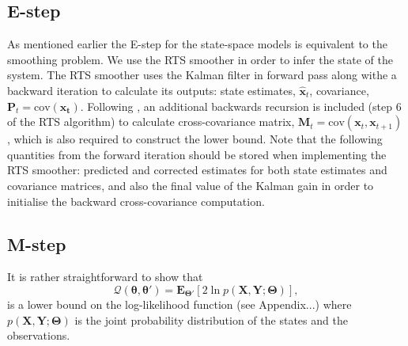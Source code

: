 \documentclass[11pt,draftcls,onecolumn,peerreview]{IEEEtran}
\begin{document}
  \subsection{E-step}
  As mentioned earlier the E-step for the state-space models is equivalent to the smoothing problem. We use the RTS smoother in order to infer the state of the system. The RTS smoother uses the Kalman filter \cite{Kalman1960} in forward pass along withe a backward iteration to calculate its outputs: state estimates, $\hat{\mathbf x}_t$, covariance, $\mathbf P_t=\mathrm{cov}(\mathbf{x_t})$. Following \cite{Gibsona2005}, an additional backwards recursion is included (step 6 of the RTS algorithm)	to calculate cross-covariance matrix, $\mathbf M_t=\mathrm{cov}(\mathbf{x}_{t},\mathbf{x}_{t+1})$, which is also required to construct the lower bound. Note that the following quantities from the forward iteration should be stored when implementing the RTS smoother: predicted and corrected estimates for both state estimates and covariance matrices, and also the final value of the Kalman gain in order to initialise the backward cross-covariance computation. 
 \subsection{M-step}
It is rather straightforward to show that 
\begin{equation}
	\mathcal Q(\boldsymbol \theta,\boldsymbol\theta')= \mathbf E_{\boldsymbol \Theta'}\left[2\ln p(\mathbf X,\mathbf Y;\boldsymbol \Theta)\right], 
\end{equation}
is a lower bound on the log-likelihood function \cite{Bishop2006} (see Appendix...)  where $p(\mathbf X,\mathbf Y;\boldsymbol \Theta)$ is the joint probability distribution of the states and the observations.
\end{document}
